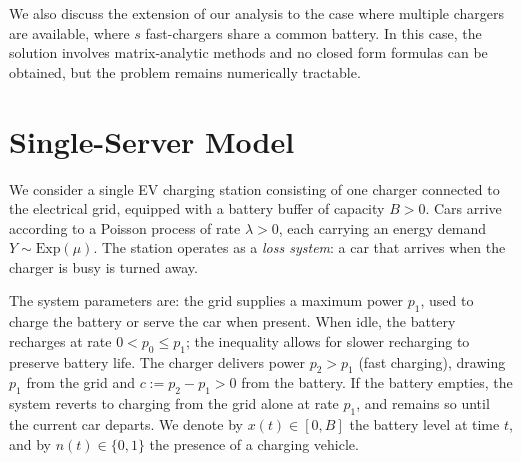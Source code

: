 \documentclass{sig-alternate-per-modified}
\begin{document}
We also discuss the extension of our analysis to the case where multiple chargers are available, where $s$ fast-chargers share a common battery. In this case, the solution involves matrix-analytic methods and no closed form formulas can be obtained, but the problem remains numerically tractable.

\section{Single-Server Model}
\label{sec:model}

We consider a single EV charging station consisting of one charger connected to the
electrical grid, equipped with a battery buffer of capacity $B > 0$. Cars arrive
according to a Poisson process of rate $\lambda > 0$, each carrying an energy demand
$Y \sim \mathrm{Exp}(\mu)$. The station operates as a \emph{loss system}: a car that
arrives when the charger is busy is turned away.

The system parameters are: the grid supplies a maximum power $p_1$, used to charge the battery or serve the car when present. When idle, the battery recharges at rate $0<p_0\leqslant p_1$; the inequality allows for slower recharging to preserve battery life. The charger delivers power $p_2>p_1$ (fast charging), drawing $p_1$ from the grid and $c:=p_2-p_1>0$ from the battery. If the battery empties, the system reverts to charging from the grid alone at rate $p_1$, and remains so until the current car departs. We denote by $x(t)\in[0,B]$ the battery level at time $t$, and by $n(t)\in\{0,1\}$ the presence of a charging vehicle.
\end{document}
